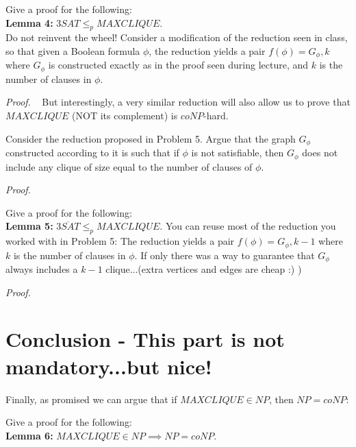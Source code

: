 \documentclass{cs0500}
\begin{document}
\begin{problem}
Give a proof for the following:\\
\noindent\textbf{Lemma 4:} $3SAT\leq_p MAXCLIQUE$. \\Do not reinvent the wheel! Consider a modification of the reduction seen in class, so that given a Boolean formula $\phi$, the reduction yields a pair $f(\phi)=G_\phi,k$ where $G_\phi$ is constructed exactly as in the proof seen during lecture, and $k$ is the number of clauses in $\phi$.
\end{problem}
\noindent\emph{Proof.}
\newpage
\ 
\newpage
But interestingly, a very similar reduction will also allow us to prove that $MAXCLIQUE$ (NOT its complement) is $coNP$-hard.  
\begin{problem}
Consider the reduction proposed in Problem 5. Argue that the graph $G_\phi$ constructed according to it is such that if $\phi$ is not satisfiable, then $G_\phi$ does not include any clique of size equal to the number of clauses of $\phi$.
\end{problem}
\noindent\emph{Proof.}
\newpage
\begin{problem}Give a proof for the following:\\
\noindent\textbf{Lemma 5:} $\overline{3SAT}\leq_p MAXCLIQUE$. You can reuse most of the reduction you worked with in Problem 5: The reduction yields a pair $f(\phi)=G_\phi,k-1$ where $k$ is the number of clauses in $\phi$. If only there was a way to guarantee that $G_\phi$ always includes a $k-1$ clique...(extra vertices and edges are cheap :) )
\end{problem}
\noindent\emph{Proof.}
\newpage
\section{Conclusion - This part is not mandatory...but nice!}
Finally, as promised we can argue that if $MAXCLIQUE\in NP$, then $NP=coNP$:
\begin{problem}Give a proof for the following:\\
\noindent\textbf{Lemma 6:} $MAXCLIQUE\in NP\implies NP=coNP$.
\end{problem}
\end{document}

